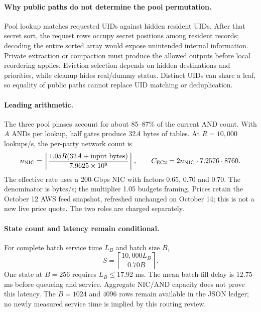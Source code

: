 \paragraph{Why public paths do not determine the pool permutation.}
Pool lookup matches requested UIDs against hidden resident UIDs. After that
secret sort, the request rows occupy secret positions among resident records;
decoding the entire sorted array would expose unintended internal information.
Private extraction or compaction must produce the allowed outputs before local
reordering applies. Eviction selection depends on hidden destinations and
priorities, while cleanup hides real/dummy status. Distinct UIDs can share a
leaf, so equality of public paths cannot replace UID matching or deduplication.

\paragraph{Leading arithmetic.}
The three pool phases account for about 85--87\% of the current AND count.
With $A$ ANDs per lookup, half gates produce $32A$ bytes of tables. At
$R=10{,}000$ lookups/s, the per-party network count is
\[
 n_{\rm NIC}=\left\lceil\frac{1.05R(32A+\text{input bytes})}
 {7.9625\times10^9}\right\rceil,
 \qquad C_{\rm EC2}=2n_{\rm NIC}\cdot7.2576\cdot8760.
\]
The effective rate uses a 200-Gbps NIC with factors 0.65, 0.70 and 0.70.
The denominator is bytes/s; the multiplier 1.05 budgets framing. Prices retain
the October 12 AWS feed snapshot, refreshed unchanged on October 14; this is
not a new live price quote. The two roles are charged separately.

\paragraph{State count and latency remain conditional.}
For complete batch service time $L_B$ and batch size $B$,
\[
 S=\left\lceil\frac{10{,}000L_B}{0.70B}\right\rceil.
\]
One state at $B=256$ requires $L_B\le17.92$ ms. The mean batch-fill delay is
12.75 ms before queueing and service. Aggregate NIC/AND capacity does not prove
this latency. The $B=1024$ and $4096$ rows remain available in the JSON ledger;
no newly measured service time is implied by this routing review.

\clearpage
